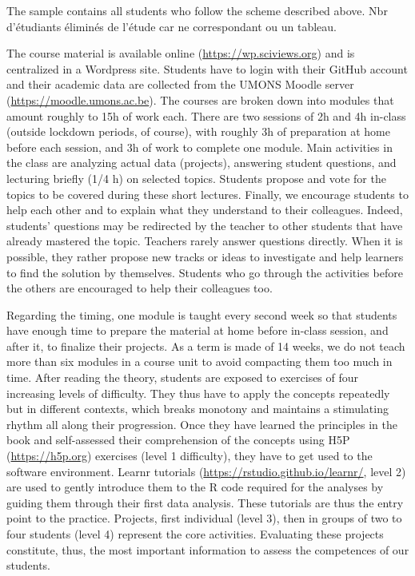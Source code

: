 \documentclass{aims}
\theoremstyle{definition}
\begin{document}
The sample contains all students who follow the scheme described above.
Nbr d'étudiants éliminés de l'étude car ne correspondant ou un tableau.

The course material is available online (\url{https://wp.sciviews.org})
and is centralized in a Wordpress site. Students have to login with
their GitHub account and their academic data are collected from the
UMONS Moodle server (\url{https://moodle.umons.ac.be}). The courses are
broken down into modules that amount roughly to 15h of work each. There
are two sessions of 2h and 4h in-class (outside lockdown periods, of
course), with roughly 3h of preparation at home before each session, and
3h of work to complete one module. Main activities in the class are
analyzing actual data (projects), answering student questions, and
lecturing briefly (1/4 h) on selected topics. Students propose and vote
for the topics to be covered during these short lectures. Finally, we
encourage students to help each other and to explain what they
understand to their colleagues. Indeed, students' questions may be
redirected by the teacher to other students that have already mastered
the topic. Teachers rarely answer questions directly. When it is
possible, they rather propose new tracks or ideas to investigate and
help learners to find the solution by themselves. Students who go
through the activities before the others are encouraged to help their
colleagues too.

Regarding the timing, one module is taught every second week so that
students have enough time to prepare the material at home before
in-class session, and after it, to finalize their projects. As a term is
made of 14 weeks, we do not teach more than six modules in a course unit
to avoid compacting them too much in time. After reading the theory,
students are exposed to exercises of four increasing levels of
difficulty. They thus have to apply the concepts repeatedly but in
different contexts, which breaks monotony and maintains a stimulating
rhythm all along their progression. Once they have learned the
principles in the book and self-assessed their comprehension of the
concepts using H5P (\url{https://h5p.org}) exercises (level 1
difficulty), they have to get used to the software environment. Learnr
tutorials (\url{https://rstudio.github.io/learnr/}, level 2) are used to
gently introduce them to the R code required for the analyses by guiding
them through their first data analysis. These tutorials are thus the
entry point to the practice. Projects, first individual (level 3), then
in groups of two to four students (level 4) represent the core
activities. Evaluating these projects constitute, thus, the most
important information to assess the competences of our students.
\end{document}
